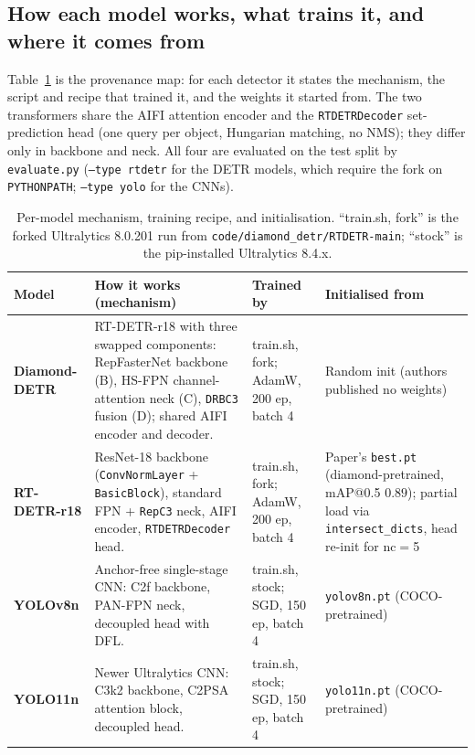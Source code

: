 \documentclass[11pt,a4paper]{article}
\begin{document}
\subsection{How each model works, what trains it, and where it comes from}
Table~\ref{tab:provenance} is the provenance map: for each detector it states the mechanism, the
script and recipe that trained it, and the weights it started from. The two transformers share the
AIFI attention encoder and the \texttt{RTDETRDecoder} set-prediction head (one query per object,
Hungarian matching, no NMS); they differ only in backbone and neck. All four are evaluated on the
test split by \texttt{evaluate.py} (\texttt{--type rtdetr} for the DETR models, which require the
fork on \texttt{PYTHONPATH}; \texttt{--type yolo} for the CNNs).

\begin{table}[H]
\centering
\caption{Per-model mechanism, training recipe, and initialisation. ``train.sh, fork'' is the
forked Ultralytics 8.0.201 run from \texttt{code/diamond\_detr/RTDETR-main}; ``stock'' is the
pip-installed Ultralytics 8.4.x.}
\label{tab:provenance}
\small
\renewcommand{\arraystretch}{1.25}
\begin{tabularx}{\textwidth}{>{\bfseries}l X p{2.5cm} X}
\toprule
\textnormal{\textbf{Model}} & \textbf{How it works (mechanism)} & \textbf{Trained by} & \textbf{Initialised from} \\
\midrule
Diamond-DETR & RT-DETR-r18 with three swapped components: RepFasterNet backbone (B),
HS-FPN channel-attention neck (C), \texttt{DRBC3} fusion (D); shared AIFI encoder and decoder. &
train.sh, fork; AdamW, 200 ep, batch 4 & Random init (authors published no weights) \\
RT-DETR-r18 & ResNet-18 backbone (\texttt{ConvNormLayer} + \texttt{BasicBlock}), standard
FPN + \texttt{RepC3} neck, AIFI encoder, \texttt{RTDETRDecoder} head. &
train.sh, fork; AdamW, 200 ep, batch 4 & Paper's \texttt{best.pt} (diamond-pretrained, mAP@0.5
$0.89$); partial load via \texttt{intersect\_dicts}, head re-init for nc$=$5 \\
YOLOv8n & Anchor-free single-stage CNN: C2f backbone, PAN-FPN neck, decoupled head with DFL. &
train.sh, stock; SGD, 150 ep, batch 4 & \texttt{yolov8n.pt} (COCO-pretrained) \\
YOLO11n & Newer Ultralytics CNN: C3k2 backbone, C2PSA attention block, decoupled head. &
train.sh, stock; SGD, 150 ep, batch 4 & \texttt{yolo11n.pt} (COCO-pretrained) \\
\bottomrule
\end{tabularx}
\end{table}
\end{document}
